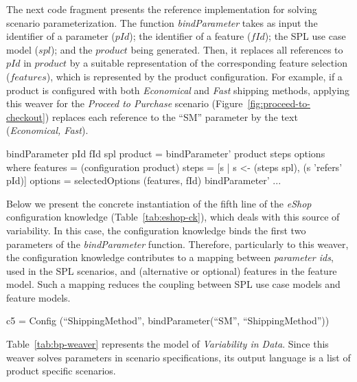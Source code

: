 

The next code fragment presents the reference implementation for solving scenario
parameterization. The function \emph{bindParameter} takes as input the identifier
of a parameter ($pId$); the identifier of a feature ($fId$); the SPL use case model ($spl$); and the
$product$ being generated. Then, it replaces all references to $pId$ in
$product$ by a suitable representation of the corresponding feature selection ($features$), which is represented by the product configuration.
For example, if a product is configured with both \emph{Economical} and \emph{Fast}
shipping methods, applying this weaver for the \emph{Proceed to
Purchase} scenario (Figure~\ref{fig:proceed-to-checkout}) replaces each reference to the ``SM'' parameter by
the text (\emph{Economical, Fast}).

\begin{code}
bindParameter pId fId spl product =
  bindParameter' product steps options
  where
    features = (configuration product)
    steps = [s | s <- (steps spl), (s 'refers' pId)]
    options = selectedOptions (features, fId)
    bindParameter' ...
\end{code}   	

Below we present the concrete instantiation of the fifth line of
the \emph{eShop} configuration knowledge (Table~\ref{tab:eshop-ck}), which deals
with this source of variability. In this case, the configuration knowledge
binds the first two parameters of the \emph{bindParameter} function. Therefore,
particularly to this weaver, the configuration knowledge contributes to
a mapping between \emph{parameter ids}, used in the SPL scenarios, and (alternative
or optional) features in the feature model. Such a mapping reduces the
coupling between SPL use case models and feature models.

\begin{code}
c5 = Config (``ShippingMethod'',
   bindParameter(``SM'', ``ShippingMethod''))
\end{code}

Table~\ref{tab:bp-weaver} represents the model of \emph{Variability in Data}. Since this weaver solves parameters in scenario specifications, its output
language is a list of product specific scenarios.


